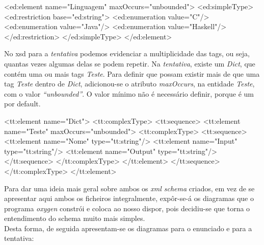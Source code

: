 \begin{myxml}
<ed:element name="Linguagem" maxOccurs="unbounded">
    <ed:simpleType>
	<ed:restriction base="ed:string">
	    <ed:enumeration value="C"/>
	    <ed:enumeration value="Java"/>
	    <ed:enumeration value="Haskell"/>
	</ed:restriction>
    </ed:simpleType>
</ed:element>
\end{myxml}


No xsd para a \textit{tentativa} podemos evidenciar a multiplicidade das tags, ou seja, quantas vezes algumas delas se podem repetir.
Na \textit{tentativa}, existe um \textit{Dict}, que contém uma ou mais tags \textit{Teste}.
Para definir que possam existir mais de que uma tag \textit{Teste} dentro de \textit{Dict}, adicionou-se o atributo \textit{maxOccurs},
na entidade \textit{Teste}, com o valor \textit{``unbounded''}. O valor mínimo não é necessário definir, porque é um por default.
\begin{myxml}
<tt:element name="Dict">
    <tt:complexType>
	<tt:sequence>
	    <tt:element name="Teste" maxOccurs="unbounded">
		<tt:complexType>
		    <tt:sequence>
			<tt:element name="Nome" type="tt:string"/>
			<tt:element name="Input" type="tt:string"/>
			<tt:element name="Output" type="tt:string"/>
		    </tt:sequence>
		</tt:complexType>
	    </tt:element>
	</tt:sequence>
    </tt:complexType>
</tt:element>
\end{myxml}

Para dar uma ideia mais geral sobre ambos os \textit{xml schema} criados, em vez de se apresentar aqui ambos os ficheiros integralmente,
 expôr-se-á os diagramas que o programa \textit{oxygen} constrói e coloca ao nosso dispor, pois decidiu-se que torna o entendimento do
schema muito mais simples.\\
\newpage
Desta forma, de seguida apresentam-se os diagramas para o enunciado e para a tentativa:\\
 
